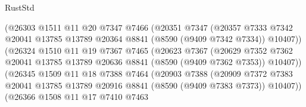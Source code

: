 \begin{lexlean}{RustStd}
\begin{coremodule}
                              (@26303
                                @1511
                                @11
                                @20
                                @7347
                                @7466
                                (@20351
                                  @7347
                                  (@20357
                                    @7333
                                    @7342
                                    @20041
                                    @13785
                                    @13789
                                    @20364
                                    @8841
                                    (@8590 (@9409 @7342 @7334))
                                    @10407))
                                (@26324
                                  @1510
                                  @11
                                  @19
                                  @7367
                                  @7465
                                  (@20623
                                    @7367
                                    (@20629
                                      @7352
                                      @7362
                                      @20041
                                      @13785
                                      @13789
                                      @20636
                                      @8841
                                      (@8590 (@9409 @7362 @7353))
                                      @10407))
                                  (@26345
                                    @1509
                                    @11
                                    @18
                                    @7388
                                    @7464
                                    (@20903
                                      @7388
                                      (@20909
                                        @7372
                                        @7383
                                        @20041
                                        @13785
                                        @13789
                                        @20916
                                        @8841
                                        (@8590 (@9409 @7383 @7373))
                                        @10407))
                                    (@26366
                                      @1508
                                      @11
                                      @17
                                      @7410
                                      @7463

\end{coremodule}
\end{lexlean}
